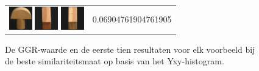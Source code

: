 \begin{figure}[tbp]
\begin{center}
\begin{tabular}{m{11cm} | m{3cm} |}
\includegraphics[width=1cm]{coil/beeld-1.eps} 
\includegraphics[width=1cm]{coil/beeld-44.eps} 
\includegraphics[width=1cm]{coil/beeld-47.eps} & {\scriptsize 
0.06904761904761905}
\end{tabular}
\caption{\label{fig:results_yxy_histgeb}De GGR-waarde en de eerste tien resultaten voor elk voorbeeld bij de beste similariteitsmaat op basis van het Yxy-histogram.}
\end{center}
\end{figure}
